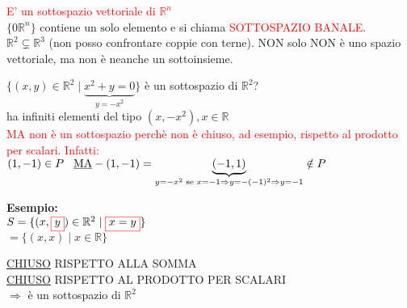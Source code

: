 \textsf{\small \textcolor{red}{E' un sottospazio vettoriale di $\mathbb{R}^n$}} \\
$\{ 0\mathbb{R}^n\}$ \textsf{\small contiene $\boxed{\text{un solo}}$ elemento e si chiama \textcolor{red}{SOTTOSPAZIO BANALE}.} \\

$\boxed{\mathbb{R}^2 \subsetneq \mathbb{R}^3}$ \textsf{\small (non posso confrontare coppie con terne). NON solo NON è uno spazio vettoriale, ma non è neanche un sottoinsieme.}

\newpage

\(
\{ (x,y) \in \mathbb{R}^2 \mid \underbrace{x^2 + y = 0} _{y = -x^2} \}
\)
\textsf{\small è un sottospazio di $\mathbb{R}^2$?}\\
\textsf{\small ha infiniti elementi del tipo $(x, -x^2), x \in \mathbb{R}$}\\
\textsf{\small \textcolor{red}{MA non è un sottospazio perchè non è chiuso, ad esempio, rispetto al prodotto per scalari. Infatti:}}\\
\(
(1, -1) \in P \hspace{0.3cm}\text{\underline{MA}} -(1, -1) = \underbrace{(-1, 1)} _{y = -x^2 \text{ se } x = -1 \Rightarrow y = -(-1)^2 \Rightarrow y = -1} \notin P
\)

\textbf{Esempio:} \\
\(
S = \{ (x,\color{red}\boxed{\normalcolor y}\normalcolor) \in \mathbb{R}^2 \mid \color{red}\boxed{\normalcolor x = y}\normalcolor\}
\)\\
\(
= \{ (x, x) \mid x \in \mathbb{R}\}
\)\\
\noindent\begin{minipage}{.5\linewidth}
\end{minipage}
\begin{minipage}{.45\linewidth}
\textsf{\small \underline{CHIUSO} RISPETTO ALLA SOMMA}\\
\textsf{\small \underline{CHIUSO} RISPETTO AL PRODOTTO PER SCALARI}\\
$\Rightarrow $ \textsf{\small è un sottospazio di $\mathbb{R}^2$} \\
\end{minipage}

